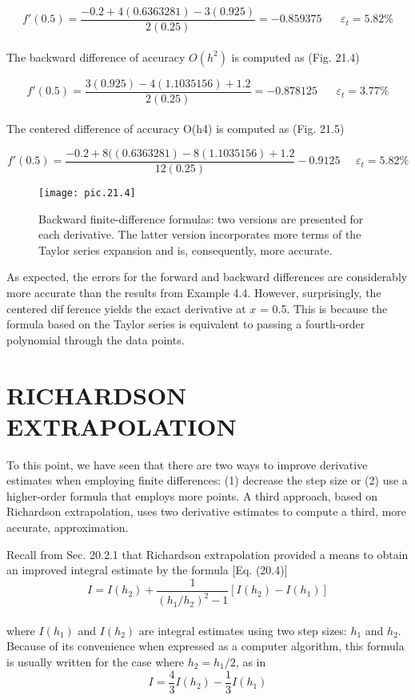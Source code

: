 	$$f'(0.5) = \dfrac{-0.2 + 4(0.6363281) -3(0.925) }{ 2(0.25)} = - 0.859375 \; \; \; \; \; \; \varepsilon_{t}=5.82\%$$\\
The backward difference of accuracy $O(h^{2})$ is computed as (Fig. 21.4)

	$$f'(0.5) = \dfrac{3(0.925) - 4(1.1035156) + 1.2}{2(0.25)} = -0.878125 \; \; \; \; \; \; \varepsilon_{t} = 3.77\%$$\\
The centered difference of accuracy O(h4) is computed as (Fig. 21.5)

	$$f'(0.5) = \dfrac{-0.2 + 8((0.6363281) -  8(1.1035156) + 1.2}{12(0.25)} -0.9125 \; \; \; \; \; \varepsilon_{t} = 5.82\%$$
	
\begin{figure}[hbt!]
	\centering
	\texttt{[image: pic.21.4]}
	\caption{\textsf{Backward finite-difference formulas: two versions are presented for each derivative. The latter
version incorporates more terms of the Taylor series expansion and is, consequently, more accurate.}} \hline
	\label{pic.21.4}
\end{figure}

\vspace{0.2in}

As expected, the errors for the forward and backward differences are considerably
more accurate than the results from Example 4.4. However, surprisingly, the centered difference yields the exact derivative at $x$ = 0.5. This is because the formula based on the
Taylor series is equivalent to passing a fourth-order polynomial through the data points.

\chapter{RICHARDSON EXTRAPOLATION}
To this point, we have seen that there are two ways to improve derivative estimates when
employing finite differences: (1) decrease the step size or (2) use a higher-order formula
that employs more points. A third approach, based on Richardson extrapolation, uses two
derivative estimates to compute a third, more accurate, approximation.

Recall from Sec. 20.2.1 that Richardson extrapolation provided a means to obtain an
improved integral estimate by the formula [Eq. (20.4)]
\begin{equation}
	\tag{21.18}
	I = I(h_{2}) + \dfrac{1}{(h_{1}/h_{2})^{2} -1} [I(h_{2}) - I(h_{1})]
\end{equation}\\
where $I(h_{1})$ and $I(h_{2})$ are integral estimates using two step sizes: $h_{1}$ and $h_{2}$. Because of
its convenience when expressed as a computer algorithm, this formula is usually written
for the case where $h_{2} = h_{1}/2$, as in
\begin{equation}
	\tag{21.19}
	I=\dfrac{4}{3}I(h_{2}) - \dfrac{1}{3}I(h_{1})
\end{equation}

